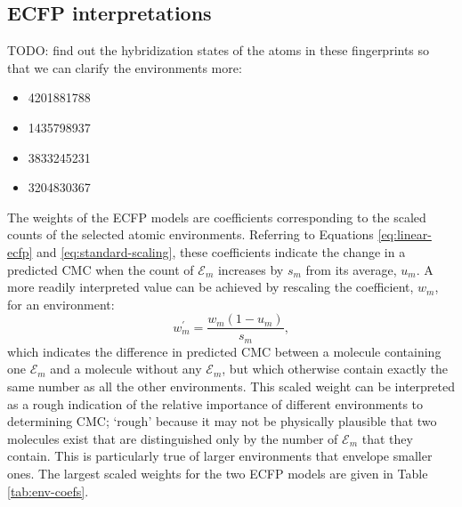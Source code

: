 \subsection{ECFP interpretations}

TODO: find out the hybridization states of the atoms in these fingerprints
so that we can clarify the environments more:
\begin{itemize}
    \item 4201881788
    \item 1435798937
    \item 3833245231
    \item 3204830367
\end{itemize}

The weights of the ECFP models are coefficients corresponding to the scaled counts of the selected atomic environments. Referring to Equations \ref{eq:linear-ecfp} and \ref{eq:standard-scaling}, these coefficients indicate
the change in a predicted CMC when the count of $\mathcal{E}_m$ increases by $s_m$ from its average, $u_m$. A more readily interpreted value can be achieved by rescaling the coefficient, $w_m$, for an environment:
\begin{equation}
    w_m^\prime = \frac{w_m(1 - u_m)}{s_m},
\end{equation}
which indicates the difference in predicted CMC between a molecule containing one $\mathcal{E}_m$ and a molecule without any $\mathcal{E}_m$, but which otherwise contain exactly the same number as all the other environments. This
scaled weight can be interpreted as a rough indication of the relative importance of different environments to determining CMC; `rough' because it may not be physically plausible that two molecules exist that are distinguished only
by the number of $\mathcal{E}_m$ that they contain. This is particularly true of larger environments that envelope smaller ones. The largest scaled weights for the two ECFP models are given in Table \ref{tab:env-coefs}.


